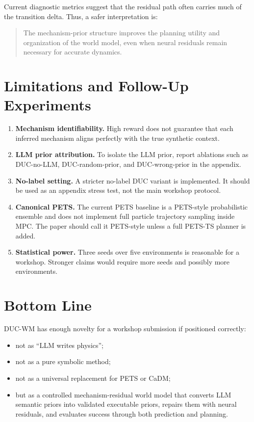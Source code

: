 \documentclass[11pt]{article}
\begin{document}
Current diagnostic metrics suggest that the residual path often carries much of the transition delta. Thus, a safer interpretation is:
\begin{quote}
The mechanism-prior structure improves the planning utility and organization of the world model, even when neural residuals remain necessary for accurate dynamics.
\end{quote}

\section{Limitations and Follow-Up Experiments}

\begin{enumerate}[leftmargin=1.5em]
    \item \textbf{Mechanism identifiability.}
    High reward does not guarantee that each inferred mechanism aligns perfectly with the true synthetic context.

    \item \textbf{LLM prior attribution.}
    To isolate the LLM prior, report ablations such as DUC-no-LLM, DUC-random-prior, and DUC-wrong-prior in the appendix.

    \item \textbf{No-label setting.}
    A stricter no-label DUC variant is implemented. It should be used as an appendix stress test, not the main workshop protocol.

    \item \textbf{Canonical PETS.}
    The current PETS baseline is a PETS-style probabilistic ensemble and does not implement full particle trajectory sampling inside MPC. The paper should call it PETS-style unless a full PETS-TS planner is added.

    \item \textbf{Statistical power.}
    Three seeds over five environments is reasonable for a workshop. Stronger claims would require more seeds and possibly more environments.
\end{enumerate}

\section{Bottom Line}

DUC-WM has enough novelty for a workshop submission if positioned correctly:
\begin{itemize}[leftmargin=1.5em]
    \item not as ``LLM writes physics'';
    \item not as a pure symbolic method;
    \item not as a universal replacement for PETS or CaDM;
    \item but as a controlled mechanism-residual world model that converts LLM semantic priors into validated executable priors, repairs them with neural residuals, and evaluates success through both prediction and planning.
\end{itemize}
\end{document}

